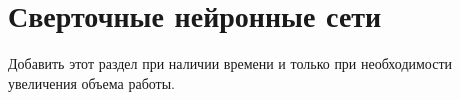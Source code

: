 \section{Сверточные нейронные сети}
\label{sec:Chapter1} 

Добавить этот раздел при наличии времени и только при необходимости увеличения объема работы.

\newpage